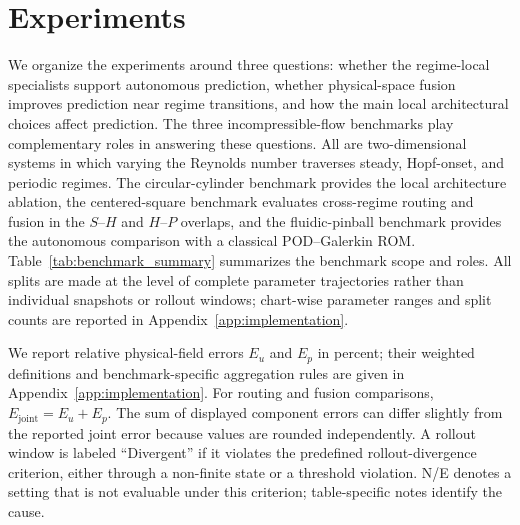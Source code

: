 \section{Experiments}
\label{sec:experiments}

We organize the experiments around three questions: whether the regime-local specialists support autonomous prediction, whether
physical-space fusion improves prediction near regime transitions, and how the main local architectural choices affect prediction.
The three incompressible-flow benchmarks play complementary roles in answering these questions. All are two-dimensional systems in which varying the Reynolds number traverses steady, Hopf-onset, and periodic regimes. The circular-cylinder benchmark provides the local architecture ablation, the centered-square benchmark evaluates cross-regime routing and fusion in the $S$--$H$ and $H$--$P$ overlaps, and the fluidic-pinball benchmark provides the autonomous comparison with a classical POD--Galerkin ROM. Table~\ref{tab:benchmark_summary} summarizes the benchmark scope and roles. All splits are made at the level of complete parameter trajectories rather than individual snapshots or rollout windows; chart-wise parameter ranges and split counts are reported in Appendix~\ref{app:implementation}.

We report relative physical-field errors $E_u$ and $E_p$ in percent; their weighted definitions and benchmark-specific aggregation rules are given in Appendix~\ref{app:implementation}. For routing and fusion comparisons, $E_{\mathrm{joint}}=E_u+E_p$. The sum of displayed component errors can differ slightly from the reported joint error because values are rounded independently. A rollout window is labeled ``Divergent'' if it violates the predefined rollout-divergence criterion, either through a non-finite state or a
threshold violation. N/E denotes a setting that is not evaluable under this criterion; table-specific notes identify the cause.

